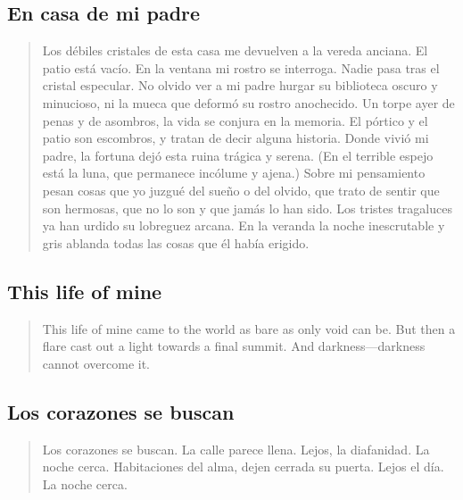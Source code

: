 \documentclass[a4paper, 12pt]{article}
\begin{document}
\pagebreak
\subsection{En casa de mi padre}

\begin{verse}
   Los débiles cristales de esta casa 
   me devuelven a la vereda anciana.
   El patio está vacío. En la ventana 
   mi rostro se interroga. Nadie pasa 
   tras el cristal especular. No olvido 
   ver a mi padre hurgar su biblioteca
   oscuro y minucioso, ni la mueca 
   que deformó su rostro anochecido.
   Un torpe ayer de penas y de asombros,
   la vida se conjura en la memoria.
   El pórtico y el patio son escombros,
   y tratan de decir alguna historia.
   Donde vivió mi padre, la fortuna 
   dejó esta ruina trágica y serena.
   (En el terrible espejo está la luna,
   que permanece incólume y ajena.)
   Sobre mi pensamiento pesan cosas 
   que yo juzgué del sueño o del olvido,
   que trato de sentir que son hermosas,
   que no lo son y que jamás lo han sido.
   Los tristes tragaluces ya han urdido
   su lobreguez arcana. En la veranda 
   la noche inescrutable y gris ablanda 
   todas las cosas que él había erigido.
\end{verse}



\pagebreak

\subsection{This life of mine}

\begin{verse}
    This life of mine came to the world as bare
    as only void can be. But then a flare
    cast out a light towards a final summit.
    And darkness—darkness cannot overcome it.
\end{verse}


\pagebreak 
\subsection{Los corazones se buscan}

\begin{verse}
    
Los corazones se buscan.
La calle parece llena.
Lejos, la diafanidad.
La noche cerca.
Habitaciones del alma,
dejen cerrada su puerta.
Lejos el día.
La noche cerca.
\end{verse}

\pagebreak
\end{document}
